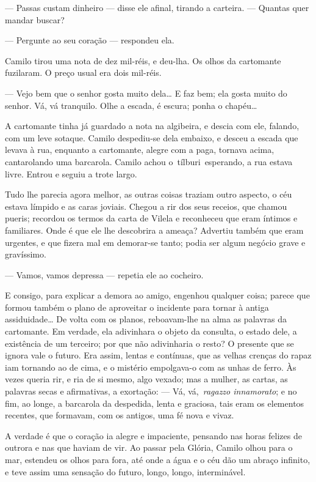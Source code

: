 --- Passas custam dinheiro --- disse ele afinal, tirando a carteira. ---
Quantas quer mandar buscar?

--- Pergunte ao seu coração --- respondeu ela.

Camilo tirou uma nota de dez mil-réis, e deu-lha. Os olhos da cartomante
fuzilaram. O preço usual era dois mil-réis.

--- Vejo bem que o senhor gosta muito dela\ldots{} E faz bem; ela gosta
muito do senhor. Vá, vá tranquilo. Olhe a escada, é escura; ponha o
chapéu\ldots{}

A cartomante tinha já guardado a nota na algibeira, e descia com ele,
falando, com um leve sotaque. Camilo despediu-se dela embaixo, e desceu
a escada que levava à rua, enquanto a cartomante, alegre com a paga,
tornava acima, cantarolando uma barcarola. Camilo achou
o~tílburi~esperando, a rua estava livre. Entrou e seguiu a trote largo.

Tudo lhe parecia agora melhor, as outras coisas traziam outro aspecto, o
céu estava límpido e as caras joviais. Chegou a rir dos seus receios,
que chamou pueris; recordou os termos da carta de Vilela e reconheceu
que eram íntimos e familiares. Onde é que ele lhe descobrira a ameaça?
Advertiu também que eram urgentes, e que fizera mal em demorar-se tanto;
podia ser algum negócio grave e gravíssimo.

--- Vamos, vamos depressa --- repetia ele ao cocheiro.

E consigo, para explicar a demora ao amigo, engenhou qualquer coisa;
parece que formou também o plano de aproveitar o incidente para tornar à
antiga assiduidade\ldots{} De volta com os planos, reboavam-lhe na alma
as palavras da cartomante. Em verdade, ela adivinhara o objeto da
consulta, o estado dele, a existência de um terceiro; por que não
adivinharia o resto? O presente que se ignora vale o futuro. Era assim,
lentas e contínuas, que as velhas crenças do rapaz iam tornando ao de
cima, e o mistério empolgava-o com as unhas de ferro. Às vezes queria
rir, e ria de si mesmo, algo vexado; mas a mulher, as cartas, as
palavras secas e afirmativas, a exortação: --- Vá, vá,~\emph{ragazzo
innamorato}; e no fim, ao longe, a barcarola da despedida, lenta e
graciosa, tais eram os elementos recentes, que formavam, com os antigos,
uma fé nova e vivaz.

A verdade é que o coração ia alegre e impaciente, pensando nas horas
felizes de outrora e nas que haviam de vir. Ao passar pela Glória,
Camilo olhou para o mar, estendeu os olhos para fora, até onde a água e
o céu dão um abraço infinito, e teve assim uma sensação do futuro,
longo, longo, interminável.

